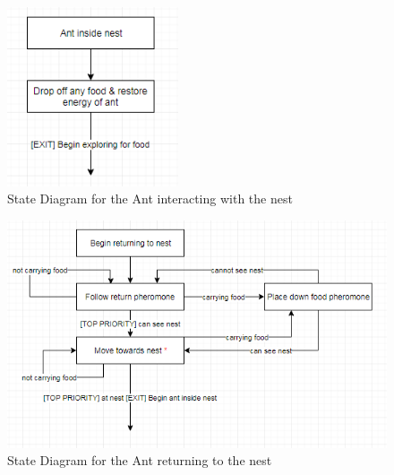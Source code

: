\begin{figure}[H]
  \centering
  \includegraphics[width=0.45\textwidth]{images/inside-nest.png}
  \caption{State Diagram for the Ant interacting with the nest}
  \label{fig:ant-inside-nest}
\end{figure}

\begin{figure}[H]
  \centering
  \includegraphics[width=1\textwidth]{images/nest-return.png}
  \caption{State Diagram for the Ant returning to the nest}
  \label{fig:ant-return-nest}
\end{figure}

